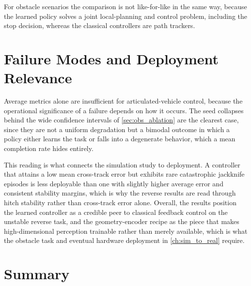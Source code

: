 For obstacle scenarios the comparison is not like-for-like in the same way, because the learned policy solves a joint local-planning and control problem, including the stop decision, whereas the classical controllers are path trackers.

\section{Failure Modes and Deployment Relevance}
\label{sec:failure_analysis}

Average metrics alone are insufficient for articulated-vehicle control, because the operational significance of a failure depends on how it occurs. The seed collapses behind the wide confidence intervals of \cref{sec:obs_ablation} are the clearest case, since they are not a uniform degradation but a bimodal outcome in which a policy either learns the task or falls into a degenerate behavior, which a mean completion rate hides entirely.

This reading is what connects the simulation study to deployment. A controller that attains a low mean cross-track error but exhibits rare catastrophic jackknife episodes is less deployable than one with slightly higher average error and consistent stability margins, which is why the reverse results are read through hitch stability rather than cross-track error alone. Overall, the results position the learned controller as a credible peer to classical feedback control on the unstable reverse task, and the geometry-encoder recipe as the piece that makes high-dimensional perception trainable rather than merely available, which is what the obstacle task and eventual hardware deployment in \cref{ch:sim_to_real} require.

\section{Summary}


